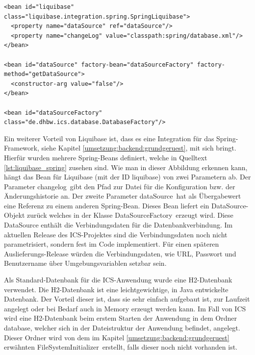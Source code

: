 \begin{lstlisting}[caption={Spring-Konfiguration für Liquibase}, label={lst:liquibase_spring}, basicstyle=\ttfamily\fontsize{10}{12}\selectfont]
<bean id="liquibase" class="liquibase.integration.spring.SpringLiquibase">
  <property name="dataSource" ref="dataSource"/>
  <property name="changeLog" value="classpath:spring/database.xml"/>
</bean>

<bean id="dataSource" factory-bean="dataSourceFactory" factory-method="getDataSource">
  <constructor-arg value="false"/>
</bean>

<bean id="dataSourceFactory" class="de.dhbw.ics.database.DatabaseFactory"/>
\end{lstlisting}
	
	
	Ein weiterer Vorteil von Liquibase ist, dass es eine Integration für das Spring-Framework, siehe Kapitel \ref{umsetzung:backend:grundgeruest}, mit sich bringt. Hierfür wurden mehrere Spring-Beans definiert, welche in Quelltext \ref{lst:liquibase_spring} zusehen sind. Wie man in dieser Abbildung erkennen kann, hängt das Bean für Liquibase (mit der \ac{ID} \glqq liquibase\grqq) von zwei Parametern ab. Der Parameter \glqq changelog\grqq \, gibt den Pfad zur Datei für die Konfiguration bzw. der Änderungshistorie an. Der zweite Parameter \glqq dataSource\grqq \, hat als Übergabewert eine Referenz zu einem anderen Spring-Bean. Dieses Bean liefert ein \glqq DataSource\grqq-Objekt zurück welches in der Klasse \glqq DataSourceFactory\grqq \, erzeugt wird. Diese DataSource enthält die Verbindungsdaten für die Datenbankverbindung. Im aktuellen Release des \ac{ICS}-Projektes sind die Verbindungsdaten noch nicht parametrisiert, sondern fest im Code implementiert. Für einen späteren Auslieferungs-Release würden die Verbindungsdaten, wie URL, Passwort und Benutzername über Umgebungsvariablen setzbar sein.
	
	Als Standard-Datenbank für die \ac{ICS}-Anwendung wurde eine H2-Datenbank verwendet. Die H2-Datenbank ist eine leichtgewichtige, in Java entwickelte Datenbank.\autocite{H2} Der Vorteil dieser ist, dass sie sehr einfach aufgebaut ist, zur Laufzeit angelegt oder bei Bedarf auch in Memory erzeugt werden kann. Im Fall von \ac{ICS} wird eine H2-Datenbank beim erstem Starten der Anwendung in dem Ordner \glqq database\grqq, welcher sich in der Dateistruktur der Anwendung befindet, angelegt. Dieser Ordner wird von dem im Kapitel \ref{umsetzung:backend:grundgeruest} erwähnten \glqq FileSystemInitializer\grqq \, erstellt, falls dieser noch nicht vorhanden ist.

